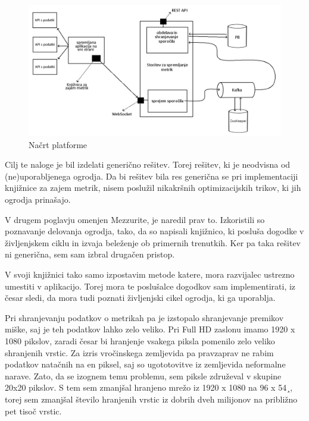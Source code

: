 \documentclass[a4paper, 12pt]{book}
\begin{document}
\begin{figure}[h]
	\begin{center}
		\includegraphics[width=1\textwidth]{design.png}
	\end{center}
	\caption{Načrt platforme}
	\label{img:design}
\end{figure}

Cilj te naloge je bil izdelati generično rešitev. Torej rešitev, ki je neodvisna od (ne)uporabljenega ogrodja. Da bi rešitev bila res generična se pri implementaciji knjižnice za zajem metrik, nisem poslužil nikakršnih optimizacijskih trikov, ki jih ogrodja prinašajo.

V drugem poglavju omenjen Mezzurite, je naredil prav to. Izkoristili so poznavanje delovanja ogrodja, tako, da so napisali knjižnico, ki posluša dogodke v življenjskem ciklu in izvaja beleženje ob primernih trenutkih. Ker pa taka rešitev ni generična, sem sam izbral drugačen pristop.

V svoji knjižnici tako samo izpostavim metode katere, mora razvijalec ustrezno umestiti v aplikacijo. Torej mora te poslušalce dogodkov sam implementirati, iz česar sledi, da mora tudi poznati življenjski cikel ogrodja, ki ga uporablja.

Pri shranjevanju podatkov o metrikah pa je izstopalo shranjevanje premikov miške, saj je teh podatkov lahko zelo veliko. Pri Full HD zaslonu imamo 1920 x 1080 pikslov, zaradi česar bi hranjenje vsakega piksla pomenilo zelo veliko shranjenih vrstic. Za izris vročinskega zemljevida pa pravzaprav ne rabim podatkov natačnih na en piksel, saj so ugototovitve iz zemljevida neformalne narave. Zato, da se izognem temu problemu, sem piksle združeval v skupine 20x20 pikslov. S tem sem zmanjšal hranjeno mrežo iz 1920 x 1080 na 96 x 54¸, torej sem zmanjšal število hranjenih vrstic iz dobrih dveh milijonov na približno pet tisoč vrstic.
\end{document}
